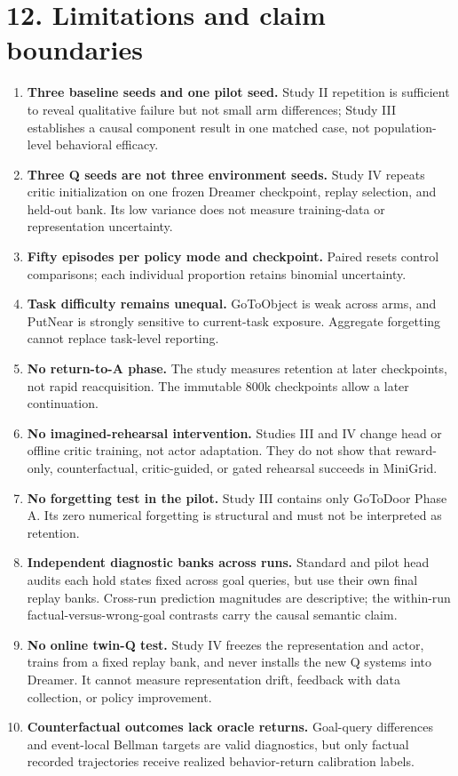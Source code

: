 \documentclass[10pt,a4paper]{article}
\newcommand{\reportsection}[1]{\section{#1}}
\begin{document}
\reportsection{12. Limitations and claim boundaries}
\begin{enumerate}
\item \textbf{Three baseline seeds and one pilot seed.} Study II repetition is sufficient to reveal qualitative failure but not small arm differences; Study III establishes a causal component result in one matched case, not population-level behavioral efficacy.
\item \textbf{Three Q seeds are not three environment seeds.} Study IV repeats critic initialization on one frozen Dreamer checkpoint, replay selection, and held-out bank. Its low variance does not measure training-data or representation uncertainty.
\item \textbf{Fifty episodes per policy mode and checkpoint.} Paired resets control comparisons; each individual proportion retains binomial uncertainty.
\item \textbf{Task difficulty remains unequal.} GoToObject is weak across arms, and PutNear is strongly sensitive to current-task exposure. Aggregate forgetting cannot replace task-level reporting.
\item \textbf{No return-to-A phase.} The study measures retention at later checkpoints, not rapid reacquisition. The immutable 800k checkpoints allow a later continuation.
\item \textbf{No imagined-rehearsal intervention.} Studies III and IV change head or offline critic training, not actor adaptation. They do not show that reward-only, counterfactual, critic-guided, or gated rehearsal succeeds in MiniGrid.
\item \textbf{No forgetting test in the pilot.} Study III contains only GoToDoor Phase A. Its zero numerical forgetting is structural and must not be interpreted as retention.
\item \textbf{Independent diagnostic banks across runs.} Standard and pilot head audits each hold states fixed across goal queries, but use their own final replay banks. Cross-run prediction magnitudes are descriptive; the within-run factual-versus-wrong-goal contrasts carry the causal semantic claim.
\item \textbf{No online twin-Q test.} Study IV freezes the representation and actor, trains from a fixed replay bank, and never installs the new Q systems into Dreamer. It cannot measure representation drift, feedback with data collection, or policy improvement.
\item \textbf{Counterfactual outcomes lack oracle returns.} Goal-query differences and event-local Bellman targets are valid diagnostics, but only factual recorded trajectories receive realized behavior-return calibration labels.

\end{enumerate}
\end{document}

